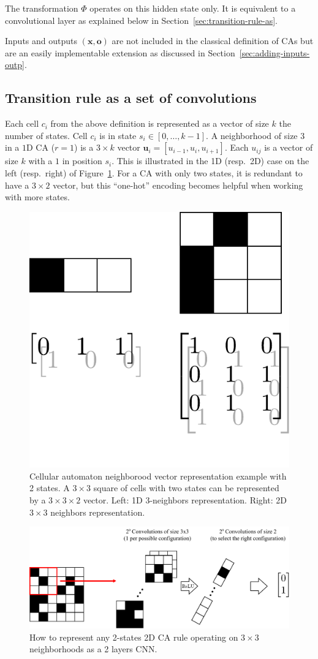 The transformation $\Phi$ operates on this hidden state only. It is equivalent
to a convolutional layer as explained below in
Section~\ref{sec:transition-rule-as}.

Inputs and outputs $(\mathbf{x}, \mathbf{o})$ are not included in the classical
definition of CAs but are an easily implementable extension as discussed in
Section~\ref{sec:adding-inputs-outp}.

\subsection{Transition rule as a set of convolutions\label{sec:transition-rule-as}}

Each cell $c_i$ from the above definition is represented as a vector of size $k$
the number of states. Cell $c_i$ is in state $s_i \in [0, \ldots, k - 1]$. A
neighborhood of size $3$ in a $1$D CA ($r=1$) is a $3 \times k$ vector
$\mathbf{u}_i = [u_{i-1}, u_{i}, u_{i+1}]$. Each $u_{ij}$ is a vector of size
$k$ with a $1$ in position $s_i$. This is illustrated in the 1D (resp.\ 2D) case
on the left (resp.\ right) of Figure~\ref{fig:cell}. For a CA with only two
states, it is redundant to have a $3\times 2$ vector, but this ``one-hot'' encoding
becomes helpful when working with more states.

\begin{figure}[htbp]
  \centering
  \includegraphics[width=.3\linewidth]{figures/repr}
  \caption{\label{fig:cell}Cellular automaton neighborood vector representation
    example with 2 states. A $3\times 3$ square of cells with two states can be
    represented by a $3\times 3 \times 2$ vector. Left: 1D 3-neighbors
    representation. Right: 2D $3\times3$ neighbors representation.}

\end{figure}

\begin{figure}[htbp]
  \centering
  \includegraphics[width=.9\linewidth]{figures/global_schema}
  \caption{\label{fig:global_schema}How to represent any 2-states 2D CA rule
    operating on $3\times 3$ neighborhoods as a 2 layers CNN.}
\end{figure}


